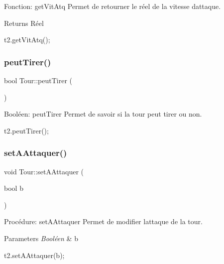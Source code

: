 Fonction\+: get\+Vit\+Atq Permet de retourner le réel de la vitesse d\textquotesingle{}attaque. 

\begin{DoxyReturn}{Returns}
Réel 
\begin{DoxyCode}
t2.getVitAtq();
\end{DoxyCode}
 
\end{DoxyReturn}
\mbox{\label{classTour_ab9f95f1a87befc1c47c5904c7dba213e}} 
\subsubsection{\texorpdfstring{peut\+Tirer()}{peutTirer()}}
{\footnotesize\ttfamily bool Tour\+::peut\+Tirer (\begin{DoxyParamCaption}{ }\end{DoxyParamCaption})}



Booléen\+: peut\+Tirer Permet de savoir si la tour peut tirer ou non. 


\begin{DoxyCode}
t2.peutTirer();
\end{DoxyCode}
 \mbox{\label{classTour_a045dac5adb162b2b5089507b445edae6}} 
\subsubsection{\texorpdfstring{set\+A\+Attaquer()}{setAAttaquer()}}
{\footnotesize\ttfamily void Tour\+::set\+A\+Attaquer (\begin{DoxyParamCaption}\item[{bool}]{b }\end{DoxyParamCaption})}



Procédure\+: set\+A\+Attaquer Permet de modifier l\textquotesingle{}attaque de la tour. 


\begin{DoxyParams}{Parameters}
{\em Booléen} & b 
\begin{DoxyCode}
t2.setAAttaquer(b);
\end{DoxyCode}
 \\
\hline
\end{DoxyParams}
\mbox{\label{classTour_a7f9a17a8138ebd8afe72520d7d8a18db}} 
